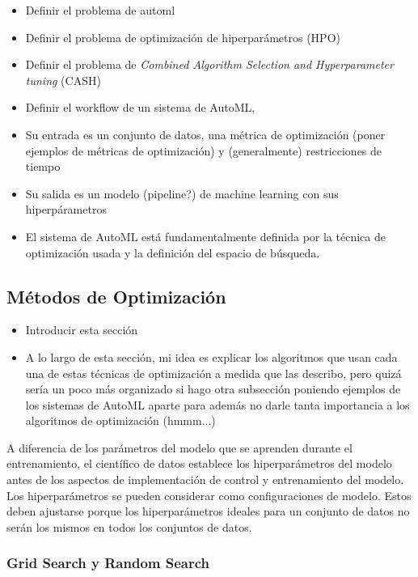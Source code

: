 \begin{itemize}
	\item Definir el problema de automl
	\item Definir el problema de optimización de hiperparámetros (HPO) 
	\item Definir el problema de \textit{Combined Algorithm Selection and Hyperparameter tuning} (CASH)
	\item Definir el workflow de un sistema de AutoML, 
	\item Su entrada es un conjunto de datos, una métrica de optimización (poner ejemplos de métricas de optimización) y (generalmente) restricciones de tiempo 
	\item Su salida es un modelo (pipeline?) de machine learning con sus hiperpárametros 
	\item El sistema de AutoML está fundamentalmente definida por la técnica de optimización usada y la definición del espacio de búsqueda.
\end{itemize}

\subsection{Métodos de Optimización}

\begin{itemize}
	\item Introducir esta sección
	\item A lo largo de esta sección, mi idea es explicar los algoritmos que usan cada una de estas técnicas de optimización a medida que las describo, pero quizá sería un poco más organizado si hago otra subsección poniendo ejemplos de los sistemas de AutoML aparte para además no darle tanta importancia a los algoritmos de optimización (hmmm...)
\end{itemize}

A diferencia de los parámetros del modelo que se aprenden durante el entrenamiento, el científico de datos establece los hiperparámetros del modelo antes de los aspectos de implementación de control y entrenamiento del modelo. Los hiperparámetros se pueden considerar como configuraciones de modelo. Estos deben ajustarse porque los hiperparámetros ideales para un conjunto de datos no serán los mismos en todos los conjuntos de datos.

\subsubsection{Grid Search y Random Search}

